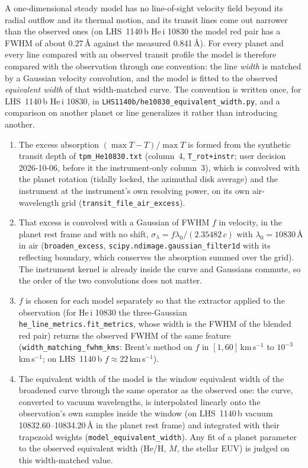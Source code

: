 A one-dimensional steady model has no line-of-sight velocity field beyond
its radial outflow and its thermal motion, and its transit lines come out
narrower than the observed ones (on LHS~1140\,b He\,{\sc i} 10830 the model
red pair has a FWHM of about 0.27\,\AA{} against the measured 0.841\,\AA).
For every planet and every line compared with an observed transit profile the
model is therefore compared with the observation through one convention: the
line \emph{width} is matched by a Gaussian velocity convolution, and the
model is fitted to the observed \emph{equivalent width} of that
width-matched curve.  The convention is written once, for LHS~1140\,b
He\,{\sc i} 10830, in \texttt{LHS1140b/he10830\_equivalent\_width.py}, and a
comparison on another planet or line generalizes it rather than introducing
another.
\begin{enumerate}
\item The excess absorption $(\max T - T)/\max T$ is formed from the
  synthetic transit depth of \texttt{tpm\_He10830.txt} (column~4,
  \texttt{T\_rot+instr}; user decision 2026-10-06, before it the
  instrument-only column~3), which is convolved with the planet rotation
  (tidally locked, the azimuthal disk average) and the instrument at the
  instrument's own resolving power, on its own air-wavelength grid
  (\texttt{transit\_file\_air\_excess}).
\item That excess is convolved with a Gaussian of FWHM $f$ in velocity, in
  the planet rest frame and with no shift,
  $\sigma_\lambda = f\lambda_0/(2.35482\,c)$ with $\lambda_0 = 10830$\,\AA{}
  in air (\texttt{broaden\_excess}, \texttt{scipy.ndimage.gaussian\_filter1d}
  with its reflecting boundary, which conserves the absorption summed over the
  grid).  The instrument kernel is already inside the curve and Gaussians
  commute, so the order of the two convolutions does not matter.
\item $f$ is chosen for each model separately so that the extractor applied
  to the observation (for He\,{\sc i} 10830 the three-Gaussian
  \texttt{he\_line\_metrics.fit\_metrics}, whose width is the FWHM of the
  blended red pair) returns the observed FWHM of the same feature
  (\texttt{width\_matching\_fwhm\_kms}: Brent's method on $f$ in
  $[1, 60]$\,km\,s$^{-1}$ to $10^{-3}$\,km\,s$^{-1}$; on LHS~1140\,b
  $f\approx 22$\,km\,s$^{-1}$).
\item The equivalent width of the model is the window equivalent width of the
  broadened curve through the same operator as the observed one: the curve,
  converted to vacuum wavelengths, is interpolated linearly onto the
  observation's own samples inside the window (on LHS~1140\,b vacuum
  10832.60--10834.20\,\AA{} in the planet rest frame) and integrated with
  their trapezoid weights (\texttt{model\_equivalent\_width}).  Any fit of a
  planet parameter to the observed equivalent width (He/H, $\dot M$, the
  stellar EUV) is judged on this width-matched value.
\end{enumerate}
